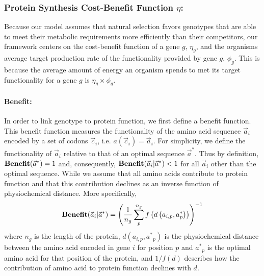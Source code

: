 \documentclass{article}
\renewcommand{\ng}{\ensuremath{{n_g}}\xspace}
\newcommand{\cvec}{\ensuremath{\Vec{c}}\xspace}
\newcommand{\cveci}{\ensuremath{\cvec_i}\xspace}
\newcommand{\aip}{\ensuremath{a_{i,p}}\xspace}
\newcommand{\aveci}{\ensuremath{\Vec{a}_i}\xspace}
\newcommand{\aopt}{\ensuremath{a^*}\xspace}
\newcommand{\aoptp}{\ensuremath{\aopt_p}\xspace}
\newcommand{\aoptvec}{\ensuremath{\Vec{a}^*}\xspace}
\newcommand{\phig}{\ensuremath{\phi_{g}}\xspace}
\newcommand{\Func}{\ensuremath{\text{\textbf{Benefit}}}\xspace}
\newcommand{\Funcaveci}{\ensuremath{\Func(\aveci|\aoptvec)}\xspace}
\newcommand{\Funcaoptvec}{\ensuremath{\Func(\aoptvec)}\xspace}
\renewcommand{\ng}{\ensuremath{{n_g}}\xspace}
\begin{document}
\subsubsection*{Protein Synthesis Cost-Benefit Function $\eta$: }
Because our model assumes that natural selection favors genotypes that are able to meet their metabolic requirements more efficiently than their competitors, our framework centers on the cost-benefit function of a gene $g$, $\eta_g$, and the organisms average target production rate of the functionality provided by gene $g$, $\phig$.
This is because the average amount of energy an organism spends to met its target functionality for a gene $g$ is $\eta_g \times \phig$.
 
\paragraph*{Benefit: }
In order to link genotype to protein function, we first define a benefit function.
This benefit function measures the functionality of the amino acid sequence \aveci encoded by a set of codons \cveci, i.e. $a(\cveci) = \aveci$.
For simplicity, we define the functionality of \aveci  relative to that of an optimal sequence $\aoptvec$.
Thus by definition,  $\Funcaoptvec = 1$ and, consequently, $\Funcaveci < 1$ for all $\aveci$ other than the optimal sequence.
While we assume that all amino acids contribute to protein function and that this contribution declines as an inverse function of physiochemical distance.
More specifically, 
\begin{equation}
\Funcaveci = \left(\frac{1}{\ng} \sum_p^\ng{} f\left(d\left(\aip, \aoptp\right)\right)\right)^{-1}
\end{equation}
where $\ng$ is the length of the protein, $d(\aip, \aoptp)$ is the physiochemical distance between the amino acid encoded in gene $i$ for position $p$ and $\aoptp$ is the optimal amino acid for that position of the protein, and $1/f(d)$ describes how the contribution of amino acid to protein function declines with $d$.
\end{document}

